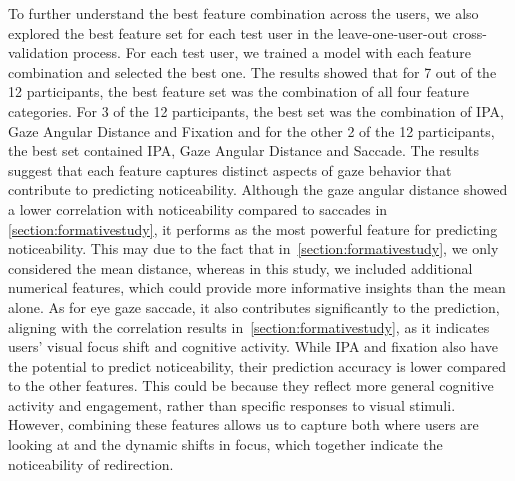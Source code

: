 To further understand the best feature combination across the users, we also explored the best feature set for each test user in the leave-one-user-out cross-validation process.
For each test user, we trained a model with each feature combination and selected the best one.
The results showed that for 7 out of the 12 participants, the best feature set was the combination of all four feature categories.
For 3 of the 12 participants, the best set was the combination of IPA, Gaze Angular Distance and Fixation and for the other 2 of the 12 participants, the best set contained IPA, Gaze Angular Distance and Saccade.
The results suggest that each feature captures distinct aspects of gaze behavior that contribute to predicting noticeability. 
Although the gaze angular distance showed a lower correlation with noticeability compared to saccades in \autoref{section:formativestudy}, it performs as the most powerful feature for predicting noticeability. 
This may due to the fact that in~\autoref{section:formativestudy}, we only considered the mean distance, whereas in this study, we included additional numerical features, which could provide more informative insights than the mean alone.
As for eye gaze saccade, it also contributes significantly to the prediction, aligning with the correlation results in~\autoref{section:formativestudy}, as it indicates users' visual focus shift and cognitive activity.
While IPA and fixation also have the potential to predict noticeability, their prediction accuracy is lower compared to the other features. 
This could be because they reflect more general cognitive activity and engagement, rather than specific responses to visual stimuli.
However, combining these features allows us to capture both where users are looking at and the dynamic shifts in focus, which together indicate the noticeability of redirection.


